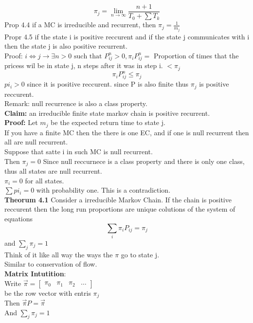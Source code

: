\documentclass{article}
\begin{document}
$$\pi_j = \lim_{n \rightarrow \infty} \frac{n+1 }{T_0 + \sum T_k }$$
Prop 4.4 if a MC is irreducible and recurrent, then $\pi_j = \frac{1}{m_j}$\\
Propr 4.5 if the state i is positive reccurent and if the state j communicates with i then the state j is also positive recurrent.\\
Proof: $i \Leftrightarrow j \rightarrow \exists n>0 \text{ such that } P^n_{ij} > 0, \pi_i P^{n}_{ij} =$ Proportion of times that the pricess wil be in state j, n steps after it was in step i. $ < \pi_j$    \\
$$\pi_i P^n_{ij} \leq \pi_j$$
$pi_i > 0 $ since it is positive reccurent. since P is also finite thus $\pi_j$ is positive reccurent.\\
Remark: null recurrence is also a class property.\\
\textbf{Claim:} an irreducible finite state markov chain is positive recurrent.\\
\textbf{Proof:} Let $m_j$ be the expected return time to state j.\\
If you have a finite MC then the there is one EC, and if one is null recurrent then all are null recurrent.\\
Suppose that satte i in such  MC is null recurrent.\\
Then $\pi_j = 0$ Since null reccurnece is a class property and there is only one class, thus all states are null recurrent.\\
$\pi_i = 0$ for all states.\\
$\sum pi_i = 0$ with probability one. This is a contradiction.\\
\textbf{Theorum 4.1} Consider a irreducible Markov Chain. If the chain is positive reccurent then the long run proportions are unique colutions of the system of equations 
$$\sum_{i} \pi_i P_{ij} = \pi_j$$
and $\sum_{j} \pi_j = 1$\\
Think of it like all way the ways the $\pi$ go to state j. \\
Similar to conservation of flow.\\
\textbf{Matrix Intutition}:\\
Write $\vec{\pi} = \begin{bmatrix}
    \pi_0 & \pi_1 & \pi_2 & \dots
\end{bmatrix}$\\
be the row vector with entris $\pi_j$\\
Then $\vec{\pi} P = \vec{\pi}$\\
And $\sum_j \pi_j = 1$\\
\end{document}
